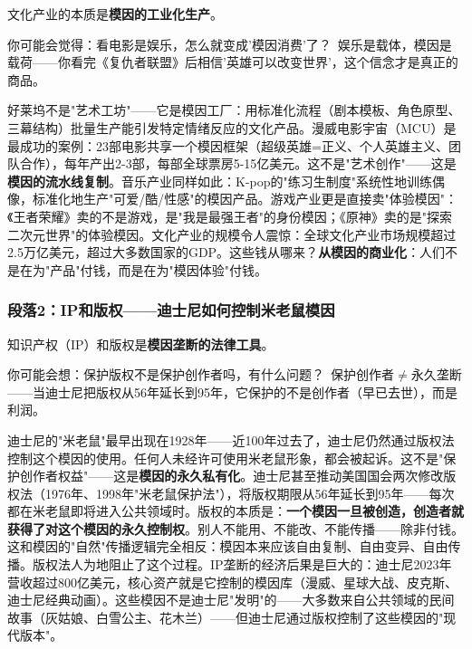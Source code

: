 \documentclass[../main.tex]{subfiles}
\begin{document}
	文化产业的本质是\textbf{模因的工业化生产}。

	\begin{tcolorbox}[colback=yellow!5, title=\textit{读者行为预测}]

		你可能会觉得：看电影是娱乐，怎么就变成'模因消费'了？\ 娱乐是载体，模因是载荷——你看完《复仇者联盟》后相信'英雄可以改变世界'，这个信念才是真正的商品。

	\end{tcolorbox}

好莱坞不是"艺术工坊"——它是模因工厂：用标准化流程（剧本模板、角色原型、三幕结构）批量生产能引发特定情绪反应的文化产品。漫威电影宇宙（MCU）是最成功的案例：23部电影共享一个模因框架（超级英雄=正义、个人英雄主义、团队合作），每年产出2-3部，每部全球票房5-15亿美元。这不是"艺术创作"——这是\textbf{模因的流水线复制}。音乐产业同样如此：K-pop的"练习生制度"系统性地训练偶像，标准化地生产"可爱/酷/性感"的模因产品。游戏产业更是直接卖"体验模因"：《王者荣耀》卖的不是游戏，是"我是最强王者"的身份模因；《原神》卖的是"探索二次元世界"的体验模因。文化产业的规模令人震惊：全球文化产业市场规模超过2.5万亿美元，超过大多数国家的GDP。这些钱从哪来？\textbf{从模因的商业化}：人们不是在为"产品"付钱，而是在为"模因体验"付钱。

	\subsubsection*{段落2：IP和版权——迪士尼如何控制米老鼠模因}

	知识产权（IP）和版权是\textbf{模因垄断的法律工具}。

	\begin{tcolorbox}[colback=yellow!5, title=\textit{读者行为预测}]

		你可能会想：保护版权不是保护创作者吗，有什么问题？\ 保护创作者$\neq$永久垄断——当迪士尼把版权从56年延长到95年，它保护的不是创作者（早已去世），而是利润。

	\end{tcolorbox}

迪士尼的"米老鼠"最早出现在1928年——近100年过去了，迪士尼仍然通过版权法控制这个模因的使用。任何人未经许可使用米老鼠形象，都会被起诉。这不是"保护创作者权益"——这是\textbf{模因的永久私有化}。迪士尼甚至推动美国国会两次修改版权法（1976年、1998年"米老鼠保护法"），将版权期限从56年延长到95年——每次都在米老鼠即将进入公共领域时。版权的本质是：\textbf{一个模因一旦被创造，创造者就获得了对这个模因的永久控制权}。别人不能用、不能改、不能传播——除非付钱。这和模因的"自然"传播逻辑完全相反：模因本来应该自由复制、自由变异、自由传播。版权法人为地阻止了这个过程。IP垄断的经济后果是巨大的：迪士尼2023年营收超过800亿美元，核心资产就是它控制的模因库（漫威、星球大战、皮克斯、迪士尼经典动画）。这些模因不是迪士尼"发明"的——大多数来自公共领域的民间故事（灰姑娘、白雪公主、花木兰）——但迪士尼通过版权控制了这些模因的"现代版本"。
\end{document}
